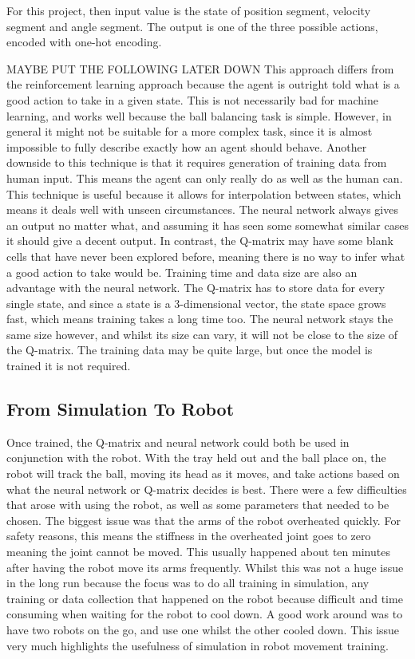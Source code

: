 \documentclass[12pt,a4paper]{article}
\begin{document}
For this project, then input value is the state of position segment, velocity segment and angle segment. The output is one of the three possible actions, encoded with one-hot encoding. 

MAYBE PUT THE FOLLOWING LATER DOWN
This approach differs from the reinforcement learning approach because the agent is outright told what is a good action to take in a given state. This is not necessarily bad for machine learning, and works well because the ball balancing task is simple. However, in general it might not be suitable for a more complex task, since it is almost impossible to fully describe exactly how an agent should behave. Another downside to this technique is that it requires generation of training data from human input. This means the agent can only really do as well as the human can. 
This technique is useful because it allows for interpolation between states, which means it deals well with unseen circumstances. The neural network always gives an output no matter what, and assuming it has seen some somewhat similar cases it should give a decent output. In contrast, the Q-matrix may have some blank cells that have never been explored before, meaning there is no way to infer what a good action to take would be. Training time and data size are also an advantage with the neural network. The Q-matrix has to store data for every single state, and since a state is a 3-dimensional vector, the state space grows fast, which means training takes a long time too. The neural network stays the same size however, and whilst its size can vary, it will not be close to the size of the Q-matrix. The training data may be quite large, but once the model is trained it is not required. 

\subsection{From Simulation To Robot}
Once trained, the Q-matrix and neural network could both be used in conjunction with the robot. With the tray held out and the ball place on, the robot will track the ball, moving its head as it moves, and take actions based on what the neural network or Q-matrix decides is best. There were a few difficulties that arose with using the robot, as well as some parameters that needed to be chosen. The biggest issue was that the arms of the robot overheated quickly. For safety reasons, this means the stiffness in the overheated joint goes to zero meaning the joint cannot be moved. This usually happened about ten minutes after having the robot move its arms frequently. Whilst this was not a huge issue in the long run because the focus was to do all training in simulation, any training or data collection that happened on the robot because difficult and time consuming when waiting for the robot to cool down. A good work around was to have two robots on the go, and use one whilst the other cooled down. This issue very much highlights the usefulness of simulation in robot movement training.
\end{document}
